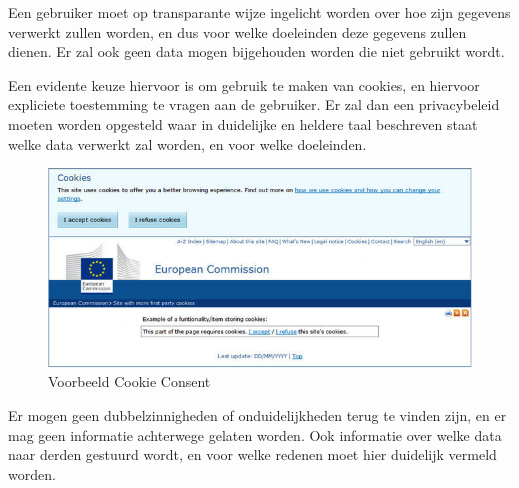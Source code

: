 Een gebruiker moet op transparante wijze ingelicht worden over hoe zijn gegevens verwerkt zullen worden, en dus voor welke doeleinden deze gegevens zullen dienen. Er zal ook geen data mogen bijgehouden worden die niet gebruikt wordt. 

Een evidente keuze hiervoor is om gebruik te maken van cookies, en hiervoor expliciete toestemming te vragen aan de gebruiker. Er zal dan een privacybeleid moeten worden opgesteld waar in duidelijke en heldere taal beschreven staat welke data verwerkt zal worden, en voor welke doeleinden. 

\begin{figure} [h!]
	\centering
	\includegraphics[width=\linewidth]{img/180321-EU-Cookie-Consent-Examples}
	\caption[Voorbeeld Cookie Consent]{Voorbeeld Cookie Consent}
	\label{fig:CookieConsentExample}
\end{figure}



Er mogen geen dubbelzinnigheden of onduidelijkheden terug te vinden zijn, en er mag geen informatie achterwege gelaten worden. Ook informatie over welke data naar derden gestuurd wordt, en voor welke redenen moet hier duidelijk vermeld worden.





